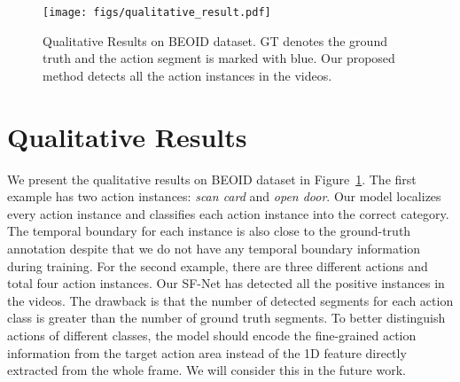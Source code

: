 \documentclass[runningheads]{llncs}
\begin{document}
	
	
	\begin{figure}[]
		\begin{center}
			\texttt{[image: figs/qualitative\_result.pdf]}
		\end{center}
		\caption{Qualitative Results on BEOID dataset. GT denotes the ground truth and the action segment is marked with blue.
			Our proposed method detects all the action instances in the videos.}
		\label{fig:qualitative}
	\end{figure}
	
	\section{Qualitative Results}  
	
	We present the qualitative results on BEOID dataset in Figure~\ref{fig:qualitative}.
	The first example has two action instances: \textit{scan card} and  \textit{open door}.
	Our model localizes every action instance and classifies each action instance into the correct category. The temporal boundary for each instance is also close to the ground-truth annotation despite that we do not have any temporal boundary information during training.
	For the second example, there are three different actions and total four action instances.
	Our SF-Net has detected all the positive instances in the videos.
	The drawback is that the number of detected segments for each action class is greater than the number of ground truth segments. 
	To better distinguish actions of different classes,  the model should encode the fine-grained action information from the target action area instead of the 1D feature directly extracted from the whole frame. 
	We will consider this in the future work.
	
	
	
	
	
	
\end{document}
